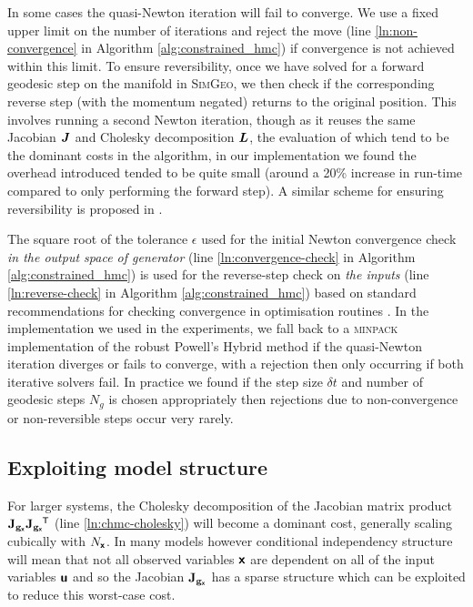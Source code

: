 In some cases the quasi-Newton iteration will fail to converge. We use a fixed upper limit on the number of iterations and reject the move (line \ref{ln:non-convergence} in Algorithm \ref{alg:constrained_hmc}) if convergence is not achieved within this limit. To ensure reversibility, once we have solved for a forward geodesic step on the manifold in \textsc{SimGeo}, we then check if the corresponding reverse step (with the momentum negated) returns to the original position. This involves running a second Newton iteration, though as it reuses the same Jacobian $\boldsymbol{J}$ and Cholesky decomposition $\boldsymbol{L}$, the evaluation of which tend to be the dominant costs in the algorithm, in our implementation we found the overhead introduced tended to be quite small (around a 20\% increase in run-time compared to only performing the forward step). A similar scheme for ensuring reversibility is proposed in \citep{zappa2017monte}. 

The square root of the tolerance $\epsilon$ used for the initial Newton convergence check \emph{in the output space of generator} (line \ref{ln:convergence-check} in Algorithm \ref{alg:constrained_hmc}) is used for the reverse-step check on \emph{the inputs} (line \ref{ln:reverse-check} in Algorithm \ref{alg:constrained_hmc}) based on standard recommendations for checking convergence in optimisation routines \citep{christensen2008devil}. In the implementation we used in the experiments, we fall back to a \textsc{minpack} \citep{more1980user} implementation of the robust Powell's Hybrid method \citep{powell1970hybrid} if the quasi-Newton iteration diverges or fails to converge, with a rejection then only occurring if both iterative solvers fail. In practice we found if the step size $\delta t$ and number of geodesic steps $N_g$ is chosen appropriately then rejections due to non-convergence or non-reversible steps occur very rarely.

\subsection{Exploiting model structure}\label{subsec:dgm-exploiting-model-structure}

For larger systems, the Cholesky decomposition of the Jacobian matrix product $\mathbf{J}_{{\mathbf{g}}_{\boldsymbol{\mathsf{x}}}}\mathbf{J}_{{\mathbf{g}}_{\boldsymbol{\mathsf{x}}}}\phantom{}^{\mkern-1.5mu\mathsf{T}}$ (line \ref{ln:chmc-cholesky}) will become a dominant cost, generally scaling cubically with $N_{\boldsymbol{\mathsf{x}}}$. In many models however conditional independency structure will mean that not all observed variables $\boldsymbol{\mathsf{x}}$ are dependent on all of the input variables $\boldsymbol{\mathsf{u}}$ and so the Jacobian $\mathbf{J}_{{\mathbf{g}}_{\boldsymbol{\mathsf{x}}}}$ has a sparse structure which can be exploited to reduce this worst-case cost. 

